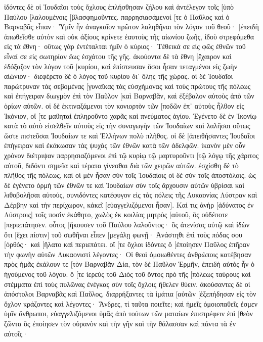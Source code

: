 ἰδόντες δὲ οἱ Ἰουδαῖοι τοὺς ὄχλους ἐπλήσθησαν ζήλου καὶ ἀντέλεγον τοῖς [ὑπὸ Παύλου [λαλουμένοις [βλασφημοῦντες. 
παρρησιασάμενοί [τε ὁ Παῦλος καὶ ὁ Βαρναβᾶς εἶπαν· Ὑμῖν ἦν ἀναγκαῖον πρῶτον λαληθῆναι τὸν λόγον τοῦ θεοῦ· [ἐπειδὴ ἀπωθεῖσθε αὐτὸν καὶ οὐκ ἀξίους κρίνετε ἑαυτοὺς τῆς αἰωνίου ζωῆς, ἰδοὺ στρεφόμεθα εἰς τὰ ἔθνη· 
οὕτως γὰρ ἐντέταλται ἡμῖν ὁ κύριος· Τέθεικά σε εἰς φῶς ἐθνῶν τοῦ εἶναί σε εἰς σωτηρίαν ἕως ἐσχάτου τῆς γῆς. 
ἀκούοντα δὲ τὰ ἔθνη [ἔχαιρον καὶ ἐδόξαζον τὸν λόγον τοῦ [κυρίου, καὶ ἐπίστευσαν ὅσοι ἦσαν τεταγμένοι εἰς ζωὴν αἰώνιον· 
διεφέρετο δὲ ὁ λόγος τοῦ κυρίου δι᾽ ὅλης τῆς χώρας. 
οἱ δὲ Ἰουδαῖοι παρώτρυναν τὰς σεβομένας [γυναῖκας τὰς εὐσχήμονας καὶ τοὺς πρώτους τῆς πόλεως καὶ ἐπήγειραν διωγμὸν ἐπὶ τὸν Παῦλον [καὶ Βαρναβᾶν, καὶ ἐξέβαλον αὐτοὺς ἀπὸ τῶν ὁρίων αὐτῶν. 
οἱ δὲ ἐκτιναξάμενοι τὸν κονιορτὸν τῶν [ποδῶν ἐπ᾽ αὐτοὺς ἦλθον εἰς Ἰκόνιον, 
οἵ [τε μαθηταὶ ἐπληροῦντο χαρᾶς καὶ πνεύματος ἁγίου. 
Ἐγένετο δὲ ἐν Ἰκονίῳ κατὰ τὸ αὐτὸ εἰσελθεῖν αὐτοὺς εἰς τὴν συναγωγὴν τῶν Ἰουδαίων καὶ λαλῆσαι οὕτως ὥστε πιστεῦσαι Ἰουδαίων τε καὶ Ἑλλήνων πολὺ πλῆθος. 
οἱ δὲ [ἀπειθήσαντες Ἰουδαῖοι ἐπήγειραν καὶ ἐκάκωσαν τὰς ψυχὰς τῶν ἐθνῶν κατὰ τῶν ἀδελφῶν. 
ἱκανὸν μὲν οὖν χρόνον διέτριψαν παρρησιαζόμενοι ἐπὶ τῷ κυρίῳ τῷ μαρτυροῦντι [τῷ λόγῳ τῆς χάριτος αὐτοῦ, διδόντι σημεῖα καὶ τέρατα γίνεσθαι διὰ τῶν χειρῶν αὐτῶν. 
ἐσχίσθη δὲ τὸ πλῆθος τῆς πόλεως, καὶ οἱ μὲν ἦσαν σὺν τοῖς Ἰουδαίοις οἱ δὲ σὺν τοῖς ἀποστόλοις. 
ὡς δὲ ἐγένετο ὁρμὴ τῶν ἐθνῶν τε καὶ Ἰουδαίων σὺν τοῖς ἄρχουσιν αὐτῶν ὑβρίσαι καὶ λιθοβολῆσαι αὐτούς, 
συνιδόντες κατέφυγον εἰς τὰς πόλεις τῆς Λυκαονίας Λύστραν καὶ Δέρβην καὶ τὴν περίχωρον, 
κἀκεῖ [εὐαγγελιζόμενοι ἦσαν]. 
Καί τις ἀνὴρ [ἀδύνατος ἐν Λύστροις] τοῖς ποσὶν ἐκάθητο, χωλὸς ἐκ κοιλίας μητρὸς [αὐτοῦ, ὃς οὐδέποτε [περιεπάτησεν. 
οὗτος [ἤκουσεν τοῦ Παύλου λαλοῦντος· ὃς ἀτενίσας αὐτῷ καὶ ἰδὼν ὅτι [ἔχει πίστιν] τοῦ σωθῆναι 
εἶπεν [μεγάλῃ φωνῇ· Ἀνάστηθι ἐπὶ τοὺς πόδας σου [ὀρθός· καὶ [ἥλατο καὶ περιεπάτει. 
οἵ [τε ὄχλοι ἰδόντες ὃ [ἐποίησεν Παῦλος ἐπῆραν τὴν φωνὴν αὐτῶν Λυκαονιστὶ λέγοντες· Οἱ θεοὶ ὁμοιωθέντες ἀνθρώποις κατέβησαν πρὸς ἡμᾶς 
ἐκάλουν τε [τὸν Βαρναβᾶν Δία, τὸν δὲ Παῦλον Ἑρμῆν, ἐπειδὴ αὐτὸς ἦν ὁ ἡγούμενος τοῦ λόγου. 
ὅ [τε ἱερεὺς τοῦ Διὸς τοῦ ὄντος πρὸ τῆς [πόλεως ταύρους καὶ στέμματα ἐπὶ τοὺς πυλῶνας ἐνέγκας σὺν τοῖς ὄχλοις ἤθελεν θύειν. 
ἀκούσαντες δὲ οἱ ἀπόστολοι Βαρναβᾶς καὶ Παῦλος, διαρρήξαντες τὰ ἱμάτια [αὐτῶν [ἐξεπήδησαν εἰς τὸν ὄχλον κράζοντες 
καὶ λέγοντες· Ἄνδρες, τί ταῦτα ποιεῖτε; καὶ ἡμεῖς ὁμοιοπαθεῖς ἐσμεν ὑμῖν ἄνθρωποι, εὐαγγελιζόμενοι ὑμᾶς ἀπὸ τούτων τῶν ματαίων ἐπιστρέφειν ἐπὶ [θεὸν ζῶντα ὃς ἐποίησεν τὸν οὐρανὸν καὶ τὴν γῆν καὶ τὴν θάλασσαν καὶ πάντα τὰ ἐν αὐτοῖς· 
